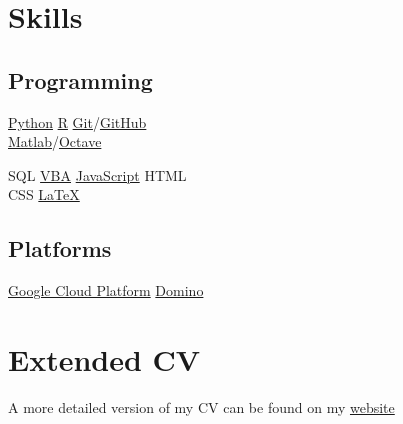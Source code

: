\documentclass[]{cv-template}
\newcommand{\discolorlinks}[1]{{\hypersetup{hidelinks}#1}}
\begin{document}
\begin{minipage}[t]{0.33\textwidth}


\section{Skills}
\subsection{Programming}
\discolorlinks{\href{https://www.python.org/}{Python} \textbullet{} 
\href{https://www.r-project.org/}{R} \textbullet{} 
\href{https://git-scm.com/}{Git}/\href{https://github.com/}{GitHub} \\
\href{https://www.mathworks.com/products/matlab.html}{Matlab}/\href{https://www.gnu.org/software/octave/index}{Octave}} \\

\discolorlinks{SQL \textbullet{} 
\href{https://docs.microsoft.com/en-us/office/vba/library-reference/concepts/getting-started-with-vba-in-office}{VBA} \textbullet{} 
\href{https://www.javascript.com/}{JavaScript} \textbullet{} 
HTML \\
CSS \textbullet{}  
\href{https://www.latex-project.org/}{\LaTeX}
\vspace{1.5mm} %

\subsection{Platforms}
\href{https://cloud.google.com/}{Google Cloud Platform} \textbullet{}
\href{https://www.dominodatalab.com/}{Domino}
}
\sectionsep




\section{Extended CV}
A more detailed version of my CV can be found on my \href{http://www.jackgrimes.uk/bio/}{website}\\

%
%

\end{minipage} 
\end{document}

